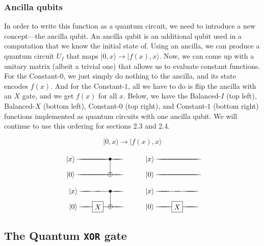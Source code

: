 \documentclass[12pt, letterpaper]{article}
\makeatletter
\def\w{\ar@{-}[l]}
\def\A#1{\save []="#1" \restore}
\def\op#1{*+[F]{\rule[-0.2ex]{0ex}{2.1ex}#1}}	%
\def\b{*={\bullet}}
\def\o{*={\oplus}}
\def\n{*-{}\w}
\def\>{\rangle}
\def\q#1{*+{\rule[-0.2ex]{0ex}{2.1ex}|#1\>}}
\makeatother
\begin{document}
\subsubsection{Ancilla qubits}

In order to write this function as a quantum circuit, we need to introduce a new concept—the ancilla qubit. An ancilla qubit is an additional qubit used in a computation that we know the initial state of. Using an ancilla, we can produce a quantum circuit $U_f$ that maps $|0, x\rangle \rightarrow |f(x), x\rangle$. Now, we can come up with a unitary matrix (albeit a trivial one) that allows us to evaluate constant functions. For the Constant-$0$, we just simply do nothing to the ancilla, and its state encodes $f(x)$. And for the Constant-$1$, all we have to do is flip the ancilla with an $X$ gate, and we get $f(x)$ for all $x$. Below, we have the Balanced-$I$ (top left), Balanced-$X$ (bottom left), Constant-$0$ (top right), and Constant-$1$ (bottom right) functions implemented as quantum circuits with one ancilla qubit. We will continue to use this ordering for sections 2.3 and 2.4.

\begin{equation}
|0, x\rangle \rightarrow |f(x), x\rangle
\end{equation}

\def\gAxB{\op{X}\w\A{gAxB}}
\def\gBxA{\b\w\A{gBxA}}
\def\gBxB{\o\w\A{gBxB}}
\def\bA{ \q{x}}
\def\bB{ \q{0}}
$$
\xymatrix@R=5pt@C=10pt{
    \bA &\n &\n &\n &\n &\n &\n &\n &\n &\n &\gBxA &\n &\n &\n
\\  \bB &\n &\n &\n &\n &\n &\n &\n &\n &\n &\gBxB &\n &\n &\n
\ar@{-}"gBxB";"gBxA"
}\hspace{1 cm}
\xymatrix@R=5pt@C=10pt{
    \bA &\n &\n &\n &\n &\n &\n &\n &\n &\n &\n &\n &\n &\n &\n
\\  \bB &\n &\n &\n &\n &\n &\n &\n &\n &\n &\n &\n &\n &\n &\n
}$$
$$
\xymatrix@R=5pt@C=10pt{
    \bA &\n &\n &\n &\gBxA &\n &\n &\n
\\  \bB &\n &\n &\gAxB &\gBxB &\n &\n &\n
\ar@{-}"gBxB";"gBxA"
}\hspace{1 cm}
\xymatrix@R=5pt@C=10pt{
    \bA &\n &\n &\n &\n &\n &\n &\n &\n
\\  \bB &\n &\n &\n &\gAxB &\n &\n &\n &\n
}$$

\subsection{The Quantum \texttt{XOR} gate}
\end{document}
